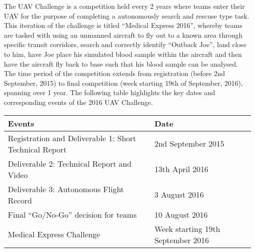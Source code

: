 The UAV Challenge is a competition held every 2 years where teams enter their UAV for the purpose of completing a autonomously search and rescuse type task.
This iteration of the challenge is titled ``Medical Express 2016'', whereby teams are tasked with using an unmanned aircraft to fly out to a known area through specific transit corridors, search and correctly identify ``Outback Joe'', land close to him, have Joe place his simulated blood sample within the aircraft and then have the aircraft fly back to base such that his blood sample can be analysed.\\

The time period of the competition extends from registration (before 2nd September, 2015) to final competition (week starting 19th of September, 2016), spanning over 1 year. The following table highlights the key dates and corresponding events of the 2016 UAV Challenge.\\

\begin{center}
	\begin{tabular}{ | l | l | }
	\hline
	Events & Date \\ \hline \hline
	Registration and Deliverable 1: Short Technical Report & 2nd September 2015 \\ \hline
	Deliverable 2: Technical Report and Video & 13th April 2016 \\ \hline
	Deliverable 3: Autonomous Flight Record & 3 August 2016 \\ \hline
	Final ``Go/No-Go'' decision for teams & 10 August 2016 \\ \hline
	Medical Express Challenge & Week starting 19th September 2016 \\
	\hline
	\end{tabular}
\end{center}